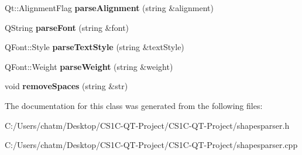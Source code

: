 \begin{DoxyCompactItemize}
\item 
\mbox{\label{class_shapes_parser_ad4720ed4f6357d020ce1dba35e494bd5}} 
Qt\+::\+Alignment\+Flag {\bfseries parse\+Alignment} (string \&alignment)
\item 
\mbox{\label{class_shapes_parser_a0bc627075b80d13c6fe1d8c0a8cdae59}} 
Q\+String {\bfseries parse\+Font} (string \&font)
\item 
\mbox{\label{class_shapes_parser_aef6699458d8ea4ac492fd5b822375abc}} 
Q\+Font\+::\+Style {\bfseries parse\+Text\+Style} (string \&text\+Style)
\item 
\mbox{\label{class_shapes_parser_a083f0b2599310eeaeee757f0e0e0e371}} 
Q\+Font\+::\+Weight {\bfseries parse\+Weight} (string \&weight)
\item 
\mbox{\label{class_shapes_parser_a237ba98aca509477828e361e3a1c0d29}} 
void {\bfseries remove\+Spaces} (string \&str)
\end{DoxyCompactItemize}


The documentation for this class was generated from the following files\+:\begin{DoxyCompactItemize}
\item 
C\+:/\+Users/chatm/\+Desktop/\+C\+S1\+C-\/\+Q\+T-\/\+Project/\+C\+S1\+C-\/\+Q\+T-\/\+Project/shapesparser.\+h\item 
C\+:/\+Users/chatm/\+Desktop/\+C\+S1\+C-\/\+Q\+T-\/\+Project/\+C\+S1\+C-\/\+Q\+T-\/\+Project/shapesparser.\+cpp\end{DoxyCompactItemize}
